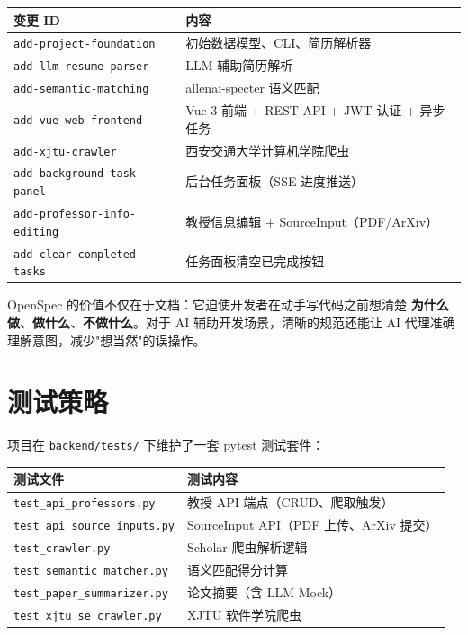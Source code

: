 \documentclass[11pt]{article}
\begin{document}
\begin{center}
\begin{tabular}{|l|l|}
\hline
\textbf{变更 ID} & \textbf{内容} \\
\hline
\texttt{add-project-foundation} & 初始数据模型、CLI、简历解析器 \\
\texttt{add-llm-resume-parser} & LLM 辅助简历解析 \\
\texttt{add-semantic-matching} & allenai-specter 语义匹配 \\
\texttt{add-vue-web-frontend} & Vue 3 前端 + REST API + JWT 认证 + 异步任务 \\
\texttt{add-xjtu-crawler} & 西安交通大学计算机学院爬虫 \\
\texttt{add-background-task-panel} & 后台任务面板（SSE 进度推送） \\
\texttt{add-professor-info-editing} & 教授信息编辑 + SourceInput（PDF/ArXiv） \\
\texttt{add-clear-completed-tasks} & 任务面板清空已完成按钮 \\
\hline
\end{tabular}
\end{center}

\begin{keypoint}
OpenSpec 的价值不仅在于文档：它迫使开发者在动手写代码之前想清楚 \textbf{为什么做}、\textbf{做什么}、\textbf{不做什么}。对于 AI 辅助开发场景，清晰的规范还能让 AI 代理准确理解意图，减少"想当然"的误操作。
\end{keypoint}

\section{测试策略}

项目在 \texttt{backend/tests/} 下维护了一套 pytest 测试套件：

\begin{center}
\begin{tabular}{|l|l|}
\hline
\textbf{测试文件} & \textbf{测试内容} \\
\hline
\texttt{test\_api\_professors.py} & 教授 API 端点（CRUD、爬取触发） \\
\texttt{test\_api\_source\_inputs.py} & SourceInput API（PDF 上传、ArXiv 提交） \\
\texttt{test\_crawler.py} & Scholar 爬虫解析逻辑 \\
\texttt{test\_semantic\_matcher.py} & 语义匹配得分计算 \\
\texttt{test\_paper\_summarizer.py} & 论文摘要（含 LLM Mock） \\
\texttt{test\_xjtu\_se\_crawler.py} & XJTU 软件学院爬虫 \\
\hline
\end{tabular}
\end{center}
\end{document}
